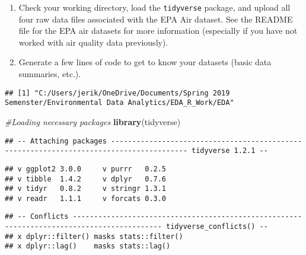 \documentclass[]{article}
\newenvironment{Shaded}{\begin{snugshade}}{\end{snugshade}}
\newcommand{\KeywordTok}[1]{\textcolor[rgb]{0.13,0.29,0.53}{\textbf{#1}}}
\newcommand{\StringTok}[1]{\textcolor[rgb]{0.31,0.60,0.02}{#1}}
\newcommand{\CommentTok}[1]{\textcolor[rgb]{0.56,0.35,0.01}{\textit{#1}}}
\newcommand{\NormalTok}[1]{#1}
\begin{document}
\begin{enumerate}
\def\labelenumi{\arabic{enumi}.}
\item
  Check your working directory, load the \texttt{tidyverse} package, and
  upload all four raw data files associated with the EPA Air dataset.
  See the README file for the EPA air datasets for more information
  (especially if you have not worked with air quality data previously).
\item
  Generate a few lines of code to get to know your datasets (basic data
  summaries, etc.).
\end{enumerate}

\begin{Shaded}
\end{Shaded}

\begin{verbatim}
## [1] "C:/Users/jerik/OneDrive/Documents/Spring 2019 Semenster/Environmental Data Analytics/EDA_R_Work/EDA"
\end{verbatim}

\begin{Shaded}
\begin{Highlighting}[]
\CommentTok{#Loading necessary packages}
\KeywordTok{library}\NormalTok{(tidyverse)}
\end{Highlighting}
\end{Shaded}

\begin{verbatim}
## -- Attaching packages ---------------------------------------------------------------------------------------- tidyverse 1.2.1 --
\end{verbatim}

\begin{verbatim}
## v ggplot2 3.0.0     v purrr   0.2.5
## v tibble  1.4.2     v dplyr   0.7.6
## v tidyr   0.8.2     v stringr 1.3.1
## v readr   1.1.1     v forcats 0.3.0
\end{verbatim}

\begin{verbatim}
## -- Conflicts ------------------------------------------------------------------------------------------- tidyverse_conflicts() --
## x dplyr::filter() masks stats::filter()
## x dplyr::lag()    masks stats::lag()
\end{verbatim}
\end{document}
